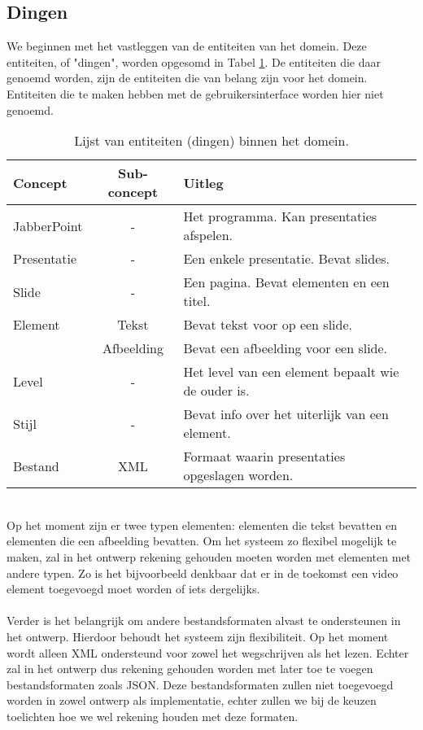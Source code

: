 \documentclass[a4paper]{article}
\begin{document}
\subsection{Dingen}
We beginnen met het vastleggen van de entiteiten van het domein. Deze entiteiten, of "dingen", worden opgesomd in Tabel \ref{table:dingen}. De entiteiten die daar genoemd worden, zijn de entiteiten die van belang zijn voor het domein. Entiteiten die te maken hebben met de gebruikersinterface worden hier niet genoemd.
\begin{table}[!h]
\centering
	\begin{tabular}{lcl}
	\toprule
 	Concept & Sub-concept & Uitleg \\ \midrule
 	JabberPoint & - & Het programma. Kan presentaties afspelen.\\
 	Presentatie & - & Een enkele presentatie. Bevat slides.\\
 	Slide & - & Een pagina. Bevat elementen en een titel.\\
 	Element & Tekst & Bevat tekst voor op een slide.\\
 	 & Afbeelding & Bevat een afbeelding voor een slide.\\
 	Level & - & Het level van een element bepaalt wie de ouder is.\\
 	Stijl & - & Bevat info over het uiterlijk van een element.\\
 	Bestand & XML & Formaat waarin presentaties opgeslagen worden.\\
 	\bottomrule
	\end{tabular}
\caption{Lijst van entiteiten (dingen) binnen het domein.}
\label{table:dingen}
\end{table}
\\
Op het moment zijn er twee typen elementen: elementen die tekst bevatten en elementen die een afbeelding bevatten. Om het systeem zo flexibel mogelijk te maken, zal in het ontwerp rekening gehouden moeten worden met elementen met andere typen. Zo is het bijvoorbeeld denkbaar dat er in de toekomst een video element toegevoegd moet worden of iets dergelijks.
\\\\
Verder is het belangrijk om andere bestandsformaten alvast te ondersteunen in het ontwerp. Hierdoor behoudt het systeem zijn flexibiliteit. Op het moment wordt alleen XML ondersteund voor zowel het wegschrijven als het lezen. Echter zal in het ontwerp dus rekening gehouden worden met later toe te voegen bestandsformaten zoals JSON. Deze bestandsformaten zullen niet toegevoegd worden in zowel ontwerp als implementatie, echter zullen we bij de keuzen toelichten hoe we wel rekening houden met deze formaten.
\end{document}

